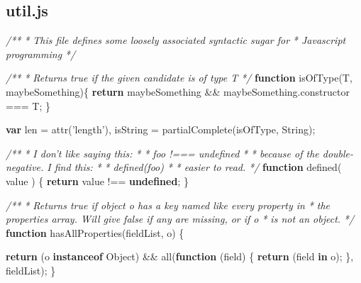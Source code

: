 \documentclass[12pt, ]{article}
\newenvironment{Shaded}{}{}
\newcommand{\KeywordTok}[1]{\textcolor[rgb]{0.00,0.44,0.13}{\textbf{{#1}}}}
\newcommand{\StringTok}[1]{\textcolor[rgb]{0.25,0.44,0.63}{{#1}}}
\newcommand{\CommentTok}[1]{\textcolor[rgb]{0.38,0.63,0.69}{\textit{{#1}}}}
\newcommand{\OtherTok}[1]{\textcolor[rgb]{0.00,0.44,0.13}{{#1}}}
\newcommand{\FunctionTok}[1]{\textcolor[rgb]{0.02,0.16,0.49}{{#1}}}
\newcommand{\NormalTok}[1]{{#1}}
\begin{document}
\pagebreak

\subsection{util.js}\label{headerux5futil}

\label{src_util}

\begin{Shaded}
\begin{Highlighting}[]
\CommentTok{/**}
\CommentTok{ * This file defines some loosely associated syntactic sugar for }
\CommentTok{ * Javascript programming }
\CommentTok{ */}


\CommentTok{/**}
\CommentTok{ * Returns true if the given candidate is of type T}
\CommentTok{ */}
\KeywordTok{function} \FunctionTok{isOfType}\NormalTok{(T, maybeSomething)\{}
   \KeywordTok{return} \NormalTok{maybeSomething && }\OtherTok{maybeSomething}\NormalTok{.}\FunctionTok{constructor} \NormalTok{=== T;}
\NormalTok{\}}

\KeywordTok{var} \NormalTok{len = }\FunctionTok{attr}\NormalTok{(}\StringTok{'length'}\NormalTok{),    }
    \NormalTok{isString = }\FunctionTok{partialComplete}\NormalTok{(isOfType, String);}

\CommentTok{/** }
\CommentTok{ * I don't like saying this:}
\CommentTok{ * }
\CommentTok{ *    foo !=== undefined}
\CommentTok{ *    }
\CommentTok{ * because of the double-negative. I find this:}
\CommentTok{ * }
\CommentTok{ *    defined(foo)}
\CommentTok{ *    }
\CommentTok{ * easier to read.}
\CommentTok{ */} 
\KeywordTok{function} \FunctionTok{defined}\NormalTok{( value ) \{}
   \KeywordTok{return} \NormalTok{value !== }\KeywordTok{undefined}\NormalTok{;}
\NormalTok{\}}

\CommentTok{/**}
\CommentTok{ * Returns true if object o has a key named like every property in }
\CommentTok{ * the properties array. Will give false if any are missing, or if o }
\CommentTok{ * is not an object.}
\CommentTok{ */}
\KeywordTok{function} \FunctionTok{hasAllProperties}\NormalTok{(fieldList, o) \{}

   \KeywordTok{return}      \NormalTok{(o }\KeywordTok{instanceof} \NormalTok{Object) }
            \NormalTok{&&}
               \FunctionTok{all}\NormalTok{(}\KeywordTok{function} \NormalTok{(field) \{         }
                  \KeywordTok{return} \NormalTok{(field }\KeywordTok{in} \NormalTok{o);         }
               \NormalTok{\}, fieldList);}
\NormalTok{\}}
\end{Highlighting}
\end{Shaded}
\end{document}
